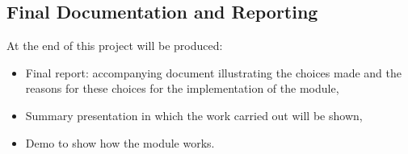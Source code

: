 \subsection{Final Documentation and Reporting}
At the end of this project will be produced:
\begin{itemize}
	\item Final report: accompanying document illustrating the choices made and the reasons for these choices for the implementation of the module,
	\item Summary presentation in which the work carried out will be shown,
	\item Demo to show how the module works.
\end{itemize}
